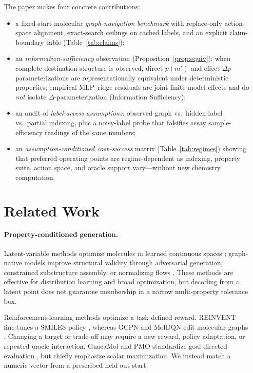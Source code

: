 The paper makes four concrete contributions:
\begin{itemize}
  \item a fixed-start molecular \emph{graph-navigation benchmark} with replace-only action-space alignment, exact-search ceilings on cached labels, and an explicit claim-boundary table (Table~\ref{tab:claims});
  \item an \emph{information-sufficiency} observation (Proposition~\ref{prop:equiv}): when complete destination structure is observed, direct $p(m')$ and effect $\Delta p$ parameterizations are representationally equivalent under deterministic properties; empirical MLP--ridge residuals are joint finite-model effects and do \emph{not} isolate $\Delta$-parameterization (Information Sufficiency);
  \item an audit of \emph{label-access assumptions}: observed-graph vs.\ hidden-label vs.\ partial indexing, plus a noisy-label probe that falsifies assay sample-efficiency readings of the same numbers;
  \item an \emph{assumption-conditioned cost--success} matrix (Table~\ref{tab:regimes}) showing that preferred operating points are regime-dependent as indexing, property suite, action space, and oracle support vary---without new chemistry computation.
\end{itemize}

\section{Related Work}
\label{sec:related}

\paragraph{Property-conditioned generation.}
Latent-variable methods optimize molecules in learned continuous spaces \citep{gomez2018chemical}; graph-native models improve structural validity through adversarial generation, constrained substructure assembly, or normalizing flows \citep{decao2018molgan,jin2018jtvae,shi2020graphaf,zang2020moflow}. These methods are effective for distribution learning and broad optimization, but decoding from a latent point does not guarantee membership in a narrow multi-property tolerance box.

Reinforcement-learning methods optimize a task-defined reward. REINVENT fine-tunes a SMILES policy \citep{olivecrona2017reinvent}, whereas GCPN and MolDQN edit molecular graphs \citep{you2018gcpn,zhou2019moldqn}. Changing a target or trade-off may require a new reward, policy adaptation, or repeated oracle interaction. GuacaMol and PMO standardize goal-directed evaluation \citep{brown2019guacamol,gao2022pmo}, but chiefly emphasize scalar maximization. We instead match a numeric vector from a prescribed held-out start.

